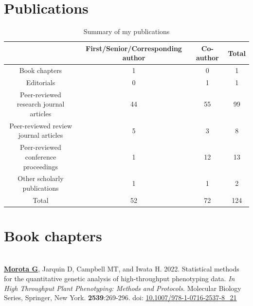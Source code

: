 \documentclass[margin,line,10pt]{res}
\newenvironment{list1}{
  \begin{list}{\ding{113}}{%
      \setlength{\itemsep}{0in}
      \setlength{\parsep}{0in} \setlength{\parskip}{0in}
      \setlength{\topsep}{0in} \setlength{\partopsep}{0in} 
      \setlength{\leftmargin}{0.17in}}}{\end{list}}
\begin{document}
\begin{resume}
\begin{list1}
  \vspace{0.5cm}

\end{list1}

  
\vspace{0.5cm}


\section{\sc Publications}
\vspace{1cm}

\begin{table}[h!]
\centering
  \begin{tabular}{ |c|c|c|c| }
 \hline
 & First/Senior/Corresponding author & Co-author & Total \\  \hline
 Book chapters & 1 & 0 & 1 \\ \hline
 Editorials & 0 & 1 & 1 \\ \hline
 Peer-reviewed research journal articles  & 44 & 55 & 99 \\  \hline
 Peer-reviewed review journal articles  & 5 & 3 & 8 \\  \hline
 Peer-reviewed conference proceedings & 1 & 12 & 13 \\ \hline
 Other scholarly publications & 1 & 1 & 2 \\ \hline
 Total & 52 &  72 & 124 \\ \hline
  \end{tabular}
    \caption{Summary of my publications}
\end{table}


\vspace{1.5cm}
\section{\sc Book chapters}
\vspace{1.0cm}

\section{}
\begin{list1}

\item  [{\bf 1}.] \textbf{\underline{Morota G}}, Jarquin D, Campbell MT, and Iwata H. 2022. Statistical methods for the quantitative genetic analysis of high-throughput phenotyping data. \emph{In High Throughput Plant Phenotyping: Methods and Protocols}. Molecular Biology Series, Springer, New York. \textbf{2539}:269-296. doi: \textcolor{blue}{\href{https://doi.org/10.1007/978-1-0716-2537-8_21}{10.1007/978-1-0716-2537-8\_21}}


\end{list1}
\end{resume}
\end{document}
